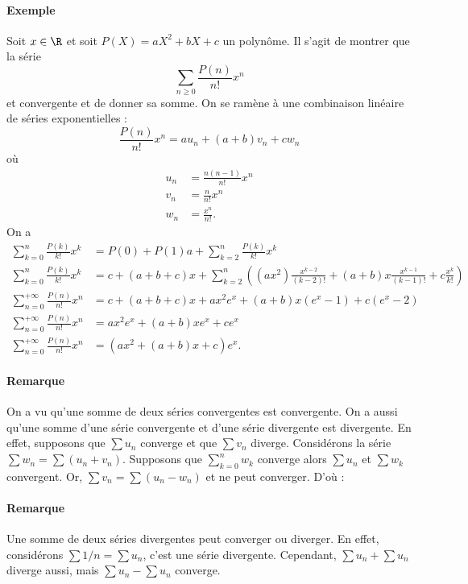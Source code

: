\paragraph{Exemple}Soit $x\in \R$ et soit $P(X) = aX^{2}+ bX + c$ un polynôme. Il s'agit de montrer que la série \[ \sum_{n\geq 0}\frac{P(n)}{n!}x^{n}\]et convergente et de donner sa somme. On se ramène à une combinaison linéaire de séries exponentielles : \[ \frac{P(n)}{n!}x^{n} = au_n + (a+b) v_n + cw_n\]où 
\begin{align*}
u_n &= \frac{n(n-1)}{n!}x^{n} \\
v_n &= \frac{n}{n!}x^{n}\\
w_n &= \frac{x^{n}}{n!}.
\end{align*}
On a 
\begin{align*}
\sum_{k=0}^{n} \frac{P(k)}{k!}x^{k} &= P(0) + P(1) a + \sum_{k=2}^{n}\frac{P(k)}{k!}x^{k}\\
\sum_{k=0}^{n} \frac{P(k)}{k!}x^{k} &=c + (a+b+c)x + \sum_{k=2}^{n}\left( (ax^{2})\frac{x^{k-2}}{(k-2)!} + (a+b)x \frac{x^{k-1}}{(k-1)!} + c\frac{x^{k}}{k!}\right)\\
\sum_{n=0}^{+\infty}\frac{P(n)}{n!}x^{n} &= c + (a+b+c)x + ax^{2}e^{x} + (a+b)x(e^{x}-1) + c(e^{x} -2)\\
\sum_{n=0}^{+\infty}\frac{P(n)}{n!}x^{n} &= ax^{2}e^{x} + (a+b)xe^{x} + ce^{x}\\
\sum_{n=0}^{+\infty}\frac{P(n)}{n!}x^{n} &= (ax^{2}+(a+b)x+c)e^{x}.
\end{align*}

\paragraph{Remarque}On a vu qu'une somme de deux séries convergentes est convergente. On a aussi qu'une somme d'une série convergente et d'une série divergente est divergente. En effet, supposons que $\sum u_n$ converge et que $\sum v_n$ diverge. Considérons la série $\sum w_n = \sum (u_n + v_n).$ Supposons que $\sum_{k=0}^{n}w_k$ converge alors $\sum u_n$ et $\sum w_k$ convergent. Or, $\sum v_n = \sum (u_n - w_n)$ et ne peut converger.
D'où :
\paragraph{Remarque}Une somme de deux séries divergentes peut converger ou diverger. En effet, considérons $\sum 1/n = \sum u_n$, c'est une série divergente. Cependant, $\sum u_n + \sum u_n$ diverge aussi, mais $\sum u_n - \sum u_n$ converge.

